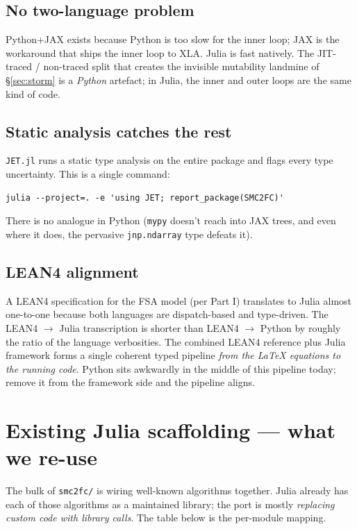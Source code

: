 \documentclass[11pt,a4paper]{article}
\begin{document}
\subsection{No two-language problem}

Python+JAX exists because Python is too slow for the inner loop;
JAX is the workaround that ships the inner loop to XLA. Julia is
fast natively. The JIT-traced / non-traced split that creates the
invisible mutability landmine of §\ref{sec:storm} is a
\emph{Python} artefact; in Julia, the inner and outer loops are
the same kind of code.

\subsection{Static analysis catches the rest}

\texttt{JET.jl} runs a static type analysis on the entire package
and flags every type uncertainty. This is a single command:
\begin{lstlisting}
julia --project=. -e 'using JET; report_package(SMC2FC)'
\end{lstlisting}
There is no analogue in Python (\texttt{mypy} doesn't reach into
JAX trees, and even where it does, the pervasive
\texttt{jnp.ndarray} type defeats it).

\subsection{LEAN4 alignment}

A LEAN4 specification for the FSA model (per Part I) translates
to Julia almost one-to-one because both languages are
dispatch-based and type-driven. The LEAN4 $\to$ Julia
transcription is shorter than LEAN4 $\to$ Python by roughly the
ratio of the language verbosities. The combined LEAN4 reference
plus Julia framework forms a single coherent typed pipeline
\emph{from the LaTeX equations to the running code}. Python sits
awkwardly in the middle of this pipeline today; remove it from
the framework side and the pipeline aligns.

\section{Existing Julia scaffolding --- what we re-use}
\label{sec:scaffolding}

The bulk of \texttt{smc2fc/} is wiring well-known algorithms
together. Julia already has each of those algorithms as a
maintained library; the port is mostly \emph{replacing custom code
with library calls}. The table below is the per-module mapping.
\end{document}
